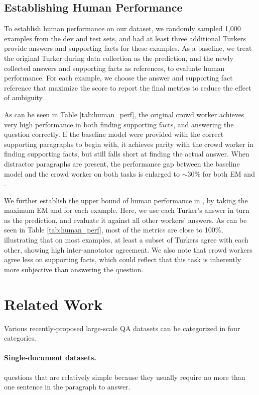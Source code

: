 \subsection{Establishing Human Performance} \label{sec:human}

To establish human performance on our dataset, we randomly sampled 1,000 examples from the dev and test sets, and had at least three additional Turkers provide answers and supporting facts for these examples. As a baseline, we treat the original Turker during data collection as the prediction, and the newly collected answers and supporting facts as references, to evaluate human performance. For each example, we choose the answer and supporting fact reference that maximize the \fone{} score to report the final metrics to reduce the effect of ambiguity \cite{rajpurkar2016squad}.

As can be seen in Table \ref{tab:human_perf}, the original crowd worker achieves very high performance in both finding supporting facts, and answering the question correctly. If the baseline model were provided with the correct supporting paragraphs to begin with, it achieves parity with the crowd worker in finding supporting facts, but still falls short at finding the actual answer. When distractor paragraphs are present,  the performance gap between the baseline model and the crowd worker on both tasks is enlarged to $\sim$30\% for both EM and \fone{}.

We further establish the upper bound of human performance in \datasetname, by taking the maximum EM and \fone{} for each example. Here, we use each Turker's answer in turn as the prediction, and evaluate it against all other workers' answers. As can be seen in Table \ref{tab:human_perf}, most of the metrics are close to 100\%, illustrating that on most examples, at least a subset of Turkers agree with each other, showing high inter-annotator agreement. We also note that crowd workers agree less on supporting facts, which could reflect that this task is inherently more subjective than answering the question.

\section{Related Work} Various recently-proposed large-scale QA datasets can be categorized in four categories.

\paragraph{Single-document datasets.} \squad{} \cite{rajpurkar2016squad, rajpurkar2018know} questions that are relatively simple because they usually require no more than one sentence in the paragraph to answer.

